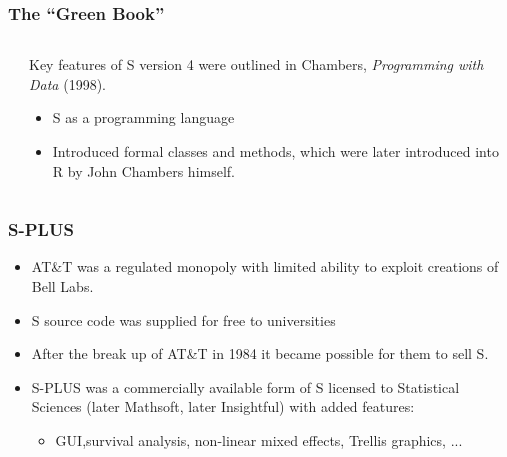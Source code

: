 \documentclass[svgnames, aspectratio=169]{beamer}
\begin{document}
\begin{frame}
  \frametitle{The ``Green Book''}

  \begin{columns}
    \begin{column}{2.5cm}
    \end{column}
    \begin{column}{10cm}
      Key features of S version 4 were outlined in Chambers, {\em Programming
      with Data} (1998).
      \begin{itemize}
      \item S as a programming language
      \item Introduced formal classes and methods, which were later
        introduced into R by John Chambers himself.
      \end{itemize}
    \end{column}
  \end{columns}

\end{frame}

\begin{frame}
  \frametitle{S-PLUS}

  \begin{itemize}
  \item AT\&T was a regulated monopoly with limited ability to exploit
    creations of Bell Labs.
  \item S source code was supplied for free to universities
  \item After the break up of AT\&T in 1984 it became possible for them
    to sell S.
  \item S-PLUS was a commercially available form of S licensed to
    Statistical Sciences (later Mathsoft, later Insightful) with added
    features:
    \begin{itemize}
    \item GUI,survival analysis, non-linear mixed effects, Trellis
      graphics, ...
    \end{itemize}
  \end{itemize}
  
\end{frame}
\end{document}
